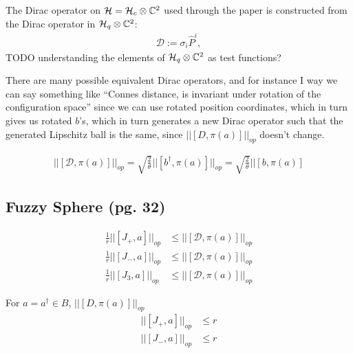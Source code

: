 \documentclass{article}
\begin{document}
The Dirac operator on $\mathcal H = \mathcal H_c \otimes \mathbb{C}^2$ used through the paper is constructed from the Dirac operator in $\mathcal H_q \otimes \mathbb{C}^2$:
\begin{align*}
    \mathcal D:= \sigma_i \hat P^i,
\end{align*}
TODO understanding the elements of $\mathcal H_q \otimes \mathbb{C}^2$ as test functions?

There are many possible equivalent Dirac operators, and for instance I way we can say something like ``Connes distance, is invariant under rotation of the configuration space'' since we can use rotated position coordinates, which in turn gives us rotated $b$'s, which in turn generates a new Dirac operator such that the generated Lipschitz ball is the same, since $||[D, \pi(a)]||_{op}$ doesn't change.

\begin{align*}
    ||[\mathcal D, \pi(a)]||_{op} = \sqrt{\frac{2}{\theta}}||[b^\dagger, \pi(a)]||_{op} = \sqrt{\frac{2}{\theta}}||[b, \pi(a)]
\end{align*}

\subsection{Fuzzy Sphere (pg. 32)}

\begin{align*}
    \frac{1}{r}||[J_+, a]||_{op} &\leq ||[\mathcal D, \pi(a)]||_{op}\\
    \frac{1}{r}||[J_-, a]||_{op} &\leq ||[\mathcal D, \pi(a)]||_{op}\\
    \frac{1}{r}||[J_3, a]||_{op} &\leq ||[\mathcal D, \pi(a)]||_{op}
\end{align*}

For $a = a^\dagger \in B$, $||[D, \pi(a)]||_{op}$
\begin{align}
    ||[J_+, a]||_{op} &\leq r\\
    ||[J_-, a]||_{op} & \leq r
\end{align}
\end{document}
